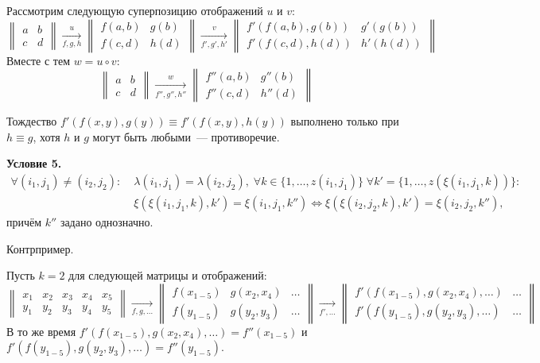 \documentclass[a4paper, 12pt]{report}
\begin{document}
Рассмотрим следующую суперпозицию отображений $u$ и $v$:
\[
\begin{Vmatrix}
a & b\\
c & d
\end{Vmatrix}
\mathop{\rightarrow}\limits^u_{f,g,h}
\begin{Vmatrix}
f(a,b) & g(b)\\
f(c,d) & h(d)
\end{Vmatrix}
\mathop{\rightarrow}\limits^v_{f',g',h'}
\begin{Vmatrix}
f'(f(a,b), g(b)) & g'(g(b))\\
f'(f(c,d),h(d)) & h'(h(d))
\end{Vmatrix}
\]
Вместе с тем $w = u \circ v$:
\[
\begin{Vmatrix}
a & b\\
c & d
\end{Vmatrix}
\mathop{\rightarrow}\limits^w_{f'',g'',h''}
\begin{Vmatrix}
f''(a,b) & g''(b)\\
f''(c,d) & h''(d)
\end{Vmatrix}
\]

Тождество $f'(f(x,y), g(y)) \equiv f'(f(x,y), h(y))$ выполнено только при $h \equiv g$, хотя $h$ и $g$ могут быть любыми~--- противоречие.

\textbf{Условие 5.}
\begin{equation*}
\begin{split}
 \forall (i_1, j_1) \neq (i_2, j_2): \; & \lambda(i_1, j_1) = \lambda(i_2, j_2), \; \forall k \in \{1, \ldots, z(i_1, j_1)\} \; \forall k' = \{ 1, \ldots, z(\xi(i_1, j_1, k)) \}:\\ & \xi(\xi(i_1, j_1, k), k') = \xi(i_1, j_1, k'') \Leftrightarrow
\xi(\xi(i_2, j_2, k), k') = \xi(i_2, j_2, k''),
\end{split}
\end{equation*}
причём $k''$ задано однозначно.

Контрпример.

Пусть $k = 2$ для следующей матрицы и отображений:
\[
\begin{Vmatrix}
x_1 & x_2 & x_3 & x_4 & x_5\\
y_1 & y_2 & y_3 & y_4 & y_5
\end{Vmatrix}
\mathop{\rightarrow}\limits_{f, g, \ldots}
\begin{Vmatrix}
f(x_{1-5}) & g(x_2, x_4) & \ldots\\
f(y_{1-5}) & g(y_2, y_3) & \ldots
\end{Vmatrix}
\mathop{\rightarrow}\limits_{f', \ldots}
\begin{Vmatrix}
f'(f(x_{1-5}), g(x_2, x_4), \ldots) & \ldots\\
f'(f(y_{1-5}), g(y_2, y_3), \ldots) & \ldots
\end{Vmatrix}
\]
В то же время $f'(f(x_{1-5}), g(x_2, x_4), \ldots) = f''(x_{1-5})$ и $f'(f(y_{1-5}), g(y_2, y_3), \ldots) = f''(y_{1-5})$.
\end{document}
